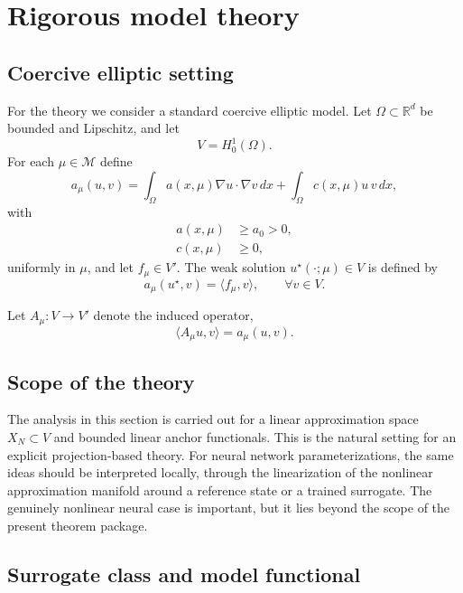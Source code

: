 \documentclass[preprint,12pt]{elsarticle}
\theoremstyle{definition}
\numberwithin{equation}{section}
\newcommand{\R}{\mathbb{R}}
\newcommand{\cM}{\mathcal{M}}
\begin{document}
\section{Rigorous model theory}
\label{sec:theory}

\subsection{Coercive elliptic setting}

For the theory we consider a standard coercive elliptic model. Let $\Omega\subset\R^d$ be bounded and Lipschitz, and let
\[
V=H_0^1(\Omega).
\]
For each $\mu\in\cM$ define
\begin{equation}
a_\mu(u,v)=\int_\Omega a(x,\mu)\nabla u\cdot\nabla v\,dx
+\int_\Omega c(x,\mu)u\,v\,dx,
\label{eq:bilinear}
\end{equation}
with
\begin{align}
a(x,\mu)&\ge a_0>0,\\
c(x,\mu)&\ge 0,
\end{align}
uniformly in $\mu$, and let $f_\mu\in V'$. The weak solution $u^\star(\cdot;\mu)\in V$ is defined by
\begin{equation}
a_\mu(u^\star,v)=\langle f_\mu,v\rangle,\qquad \forall v\in V.
\label{eq:weak}
\end{equation}

Let $A_\mu:V\to V'$ denote the induced operator,
\[
\langle A_\mu u,v\rangle=a_\mu(u,v).
\]

\subsection{Scope of the theory}

The analysis in this section is carried out for a linear approximation space $X_N\subset V$ and bounded linear anchor functionals. This is the natural setting for an explicit projection-based theory. For neural network parameterizations, the same ideas should be interpreted locally, through the linearization of the nonlinear approximation manifold around a reference state or a trained surrogate. The genuinely nonlinear neural case is important, but it lies beyond the scope of the present theorem package.

\subsection{Surrogate class and model functional}
\end{document}

